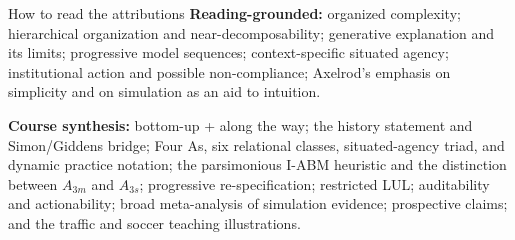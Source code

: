 \documentclass[11pt,a4paper]{article}
\begin{document}
\begin{principle}{How to read the attributions}
\textbf{Reading-grounded:} organized complexity; hierarchical organization and near-decomposability; generative explanation and its limits; progressive model sequences; context-specific situated agency; institutional action and possible non-compliance; Axelrod's emphasis on simplicity and on simulation as an aid to intuition.

\textbf{Course synthesis:} bottom-up + along the way; the history statement and Simon/Giddens bridge; Four As, six relational classes, situated-agency triad, and dynamic practice notation; the parsimonious I-ABM heuristic and the distinction between $A_{3m}$ and $A_{3s}$; progressive re-specification; restricted LUL; auditability and actionability; broad meta-analysis of simulation evidence; prospective claims; and the traffic and soccer teaching illustrations.
\end{principle}
\end{document}
